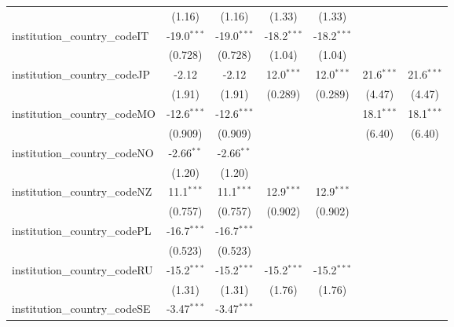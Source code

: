\begin{tabular}{lcccccc}
                                         & (1.16)        & (1.16)        & (1.33)        & (1.33)        &               &   \\   
   institution\_country\_codeIT          & -19.0$^{***}$ & -19.0$^{***}$ & -18.2$^{***}$ & -18.2$^{***}$ &               &   \\   
                                         & (0.728)       & (0.728)       & (1.04)        & (1.04)        &               &   \\   
   institution\_country\_codeJP          & -2.12         & -2.12         & 12.0$^{***}$  & 12.0$^{***}$  & 21.6$^{***}$  & 21.6$^{***}$\\   
                                         & (1.91)        & (1.91)        & (0.289)       & (0.289)       & (4.47)        & (4.47)\\   
   institution\_country\_codeMO          & -12.6$^{***}$ & -12.6$^{***}$ &               &               & 18.1$^{***}$  & 18.1$^{***}$\\   
                                         & (0.909)       & (0.909)       &               &               & (6.40)        & (6.40)\\   
   institution\_country\_codeNO          & -2.66$^{**}$  & -2.66$^{**}$  &               &               &               &   \\   
                                         & (1.20)        & (1.20)        &               &               &               &   \\   
   institution\_country\_codeNZ          & 11.1$^{***}$  & 11.1$^{***}$  & 12.9$^{***}$  & 12.9$^{***}$  &               &   \\   
                                         & (0.757)       & (0.757)       & (0.902)       & (0.902)       &               &   \\   
   institution\_country\_codePL          & -16.7$^{***}$ & -16.7$^{***}$ &               &               &               &   \\   
                                         & (0.523)       & (0.523)       &               &               &               &   \\   
   institution\_country\_codeRU          & -15.2$^{***}$ & -15.2$^{***}$ & -15.2$^{***}$ & -15.2$^{***}$ &               &   \\   
                                         & (1.31)        & (1.31)        & (1.76)        & (1.76)        &               &   \\   
   institution\_country\_codeSE          & -3.47$^{***}$ & -3.47$^{***}$ &               &               &               &   \\   

\end{tabular}
